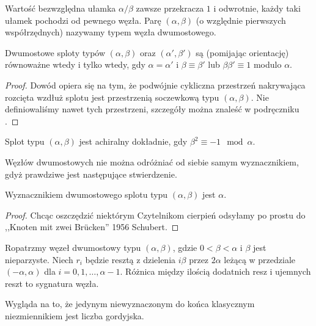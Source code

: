 Wartość bezwzględna ułamka $\alpha/\beta$ zawsze przekracza $1$ i odwrotnie, każdy taki ułamek pochodzi od pewnego węzła.
Parę $(\alpha, \beta)$ (o względnie pierwszych współrzędnych) nazywamy typem węzła dwumostowego.

\begin{proposition}
\label{prp:tangle_equivalence}
	Dwumostowe sploty typów $(\alpha, \beta)$ oraz $(\alpha', \beta')$ są (pomijając orientację) równoważne wtedy i tylko wtedy, gdy $\alpha = \alpha'$ i $\beta \equiv \beta'$ lub $\beta \beta'\equiv 1$ modulo $\alpha$.
\end{proposition}

\begin{proof}
	Dowód opiera się na tym, że podwójnie cykliczna przestrzeń nakrywająca rozcięta wzdłuż splotu jest przestrzenią soczewkową typu $(\alpha, \beta)$.
	Nie definiowaliśmy nawet tych przestrzeni, szczegóły można znaleść w podręczniku \cite{murasugi96}.
\end{proof}

\begin{proposition}
\label{prp:chiral_tangles}
	Splot typu $(\alpha, \beta)$ jest achiralny dokładnie, gdy $\beta^2 \equiv -1 \mod \alpha$.
\end{proposition}


Węzłów dwumostowych nie można odróżniać od siebie samym wyznacznikiem, gdyż prawdziwe jest następujące stwierdzenie.

\begin{proposition}
\label{prp:tangle_determinant}
	Wyznacznikiem dwumostowego splotu typu $(\alpha, \beta)$ jest $\alpha$.
\end{proposition}

\begin{proof}
	Chcąc oszczędzić niektórym Czytelnikom cierpień odsyłamy po prostu do ,,Knoten mit zwei Brücken'' 1956 Schubert.
\end{proof}

\begin{proposition}
\label{prp:tangle_signature}
	Ropatrzmy węzeł dwumostowy typu $(\alpha, \beta)$, gdzie $0 < \beta < \alpha$ i $\beta$ jest nieparzyste.
	Niech $r_i$ będzie resztą z dzielenia $i\beta$ przez $2\alpha$ leżącą w przedziale $(-\alpha, \alpha)$ dla $i = 0, 1, \ldots, \alpha - 1$.
	Różnica między ilością dodatnich resz i ujemnych reszt to sygnatura węzła.
\end{proposition}

Wygląda na to, że jedynym niewyznaczonym do końca klasycznym niezmiennikiem jest liczba gordyjska.

